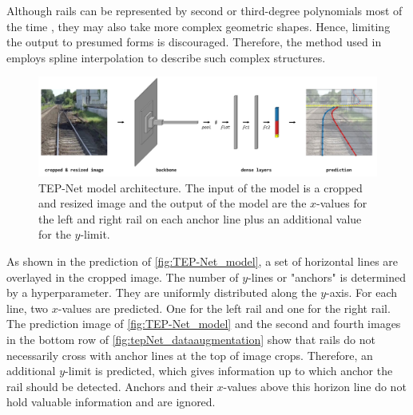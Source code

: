 Although rails can be represented by second or third-degree polynomials most of the time \cite{PolyLaneNetRoad2021}, they may also take more complex geometric shapes.
Hence, limiting the output to presumed forms is discouraged.
Therefore, the method used in \cite{tepNet2024} employs spline interpolation to describe such complex structures.

\begin{figure}[H]
    \centering
    \includegraphics[width=\linewidth]{PICs/Baselinepaper/TEP-Net_model.jpg}
    \caption{\ac{TEP}-Net model architecture\cite{tepNet2024}. The input of the model is a cropped and resized image and the output of the model are the $x$-values for the left and right rail on each anchor line plus an additional value for the $y$-limit.}
    \label{fig:TEP-Net_model}
\end{figure}

As shown in the prediction of \autoref{fig:TEP-Net_model}, a set of horizontal lines are overlayed in the cropped image.
The number of $y$-lines or "anchors" is determined by a hyperparameter.
They are uniformly distributed along the $y$-axis. For each line, two $x$-values are predicted.
One for the left rail and one for the right rail.
The prediction image of \autoref{fig:TEP-Net_model} and the second and fourth images in the bottom row of \autoref{fig:tepNet_dataaugmentation} show that rails do not necessarily cross with anchor lines at the top of image crops.
Therefore, an additional $y$-limit is predicted, which gives information up to which anchor the rail should be detected.
Anchors and their $x$-values above this horizon line do not hold valuable information and are ignored.

